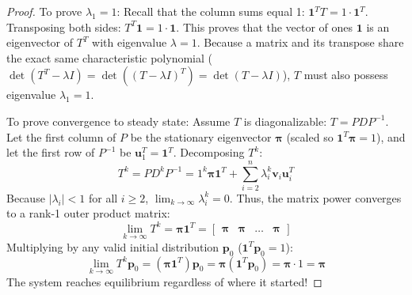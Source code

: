 \begin{proof}
To prove $\lambda_1 = 1$:
Recall that the column sums equal 1: $\mathbf{1}^T T = 1 \cdot \mathbf{1}^T$.
Transposing both sides: $T^T \mathbf{1} = 1 \cdot \mathbf{1}$.
This proves that the vector of ones $\mathbf{1}$ is an eigenvector of $T^T$ with eigenvalue $\lambda = 1$.
Because a matrix and its transpose share the exact same characteristic polynomial ($\det(T^T - \lambda I) = \det((T - \lambda I)^T) = \det(T - \lambda I)$), $T$ must also possess eigenvalue $\lambda_1 = 1$.

To prove convergence to steady state:
Assume $T$ is diagonalizable: $T = P D P^{-1}$. Let the first column of $P$ be the stationary eigenvector $\boldsymbol{\pi}$ (scaled so $\mathbf{1}^T \boldsymbol{\pi} = 1$), and let the first row of $P^{-1}$ be $\mathbf{u}_1^T = \mathbf{1}^T$.
Decomposing $T^k$:
\begin{equation}
T^k = P D^k P^{-1} = 1^k \boldsymbol{\pi} \mathbf{1}^T + \sum_{i=2}^n \lambda_i^k \mathbf{v}_i \mathbf{u}_i^T
\end{equation}
Because $|\lambda_i| < 1$ for all $i \ge 2$, $\lim_{k \to \infty} \lambda_i^k = 0$.
Thus, the matrix power converges to a rank-1 outer product matrix:
\begin{equation}
\lim_{k \to \infty} T^k = \boldsymbol{\pi} \mathbf{1}^T = \begin{bmatrix} \boldsymbol{\pi} & \boldsymbol{\pi} & \dots & \boldsymbol{\pi} \end{bmatrix}
\end{equation}
Multiplying by any valid initial distribution $\mathbf{p}_0$ ($\mathbf{1}^T \mathbf{p}_0 = 1$):
\begin{equation}
\lim_{k \to \infty} T^k \mathbf{p}_0 = (\boldsymbol{\pi} \mathbf{1}^T)\mathbf{p}_0 = \boldsymbol{\pi}(\mathbf{1}^T \mathbf{p}_0) = \boldsymbol{\pi} \cdot 1 = \boldsymbol{\pi}
\end{equation}
The system reaches equilibrium regardless of where it started!
\end{proof}

